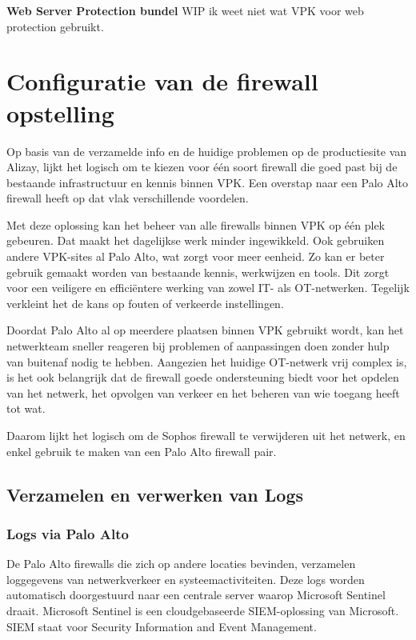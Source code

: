 \textbf{Web Server Protection bundel}
WIP ik weet niet wat VPK voor web protection gebruikt.




\chapter{Configuratie van de firewall opstelling}
\label{ch:configFW}

Op basis van de verzamelde info en de huidige problemen op de productiesite van Alizay, lijkt het logisch om te kiezen voor één soort firewall die goed past bij de bestaande infrastructuur en kennis binnen VPK. Een overstap naar een Palo Alto firewall heeft op dat vlak verschillende voordelen.

\vspace{5mm}
Met deze oplossing kan het beheer van alle firewalls binnen VPK op één plek gebeuren. Dat maakt het dagelijkse werk minder ingewikkeld. Ook gebruiken andere VPK-sites al Palo Alto, wat zorgt voor meer eenheid. Zo kan er beter gebruik gemaakt worden van bestaande kennis, werkwijzen en tools. Dit zorgt voor een veiligere en efficiëntere werking van zowel IT- als OT-netwerken. Tegelijk verkleint het de kans op fouten of verkeerde instellingen.

\vspace{5mm}
Doordat Palo Alto al op meerdere plaatsen binnen VPK gebruikt wordt, kan het netwerkteam sneller reageren bij problemen of aanpassingen doen zonder hulp van buitenaf nodig te hebben. Aangezien het huidige OT-netwerk vrij complex is, is het ook belangrijk dat de firewall goede ondersteuning biedt voor het opdelen van het netwerk, het opvolgen van verkeer en het beheren van wie toegang heeft tot wat.

\vspace{5mm}
Daarom lijkt het logisch om de Sophos firewall te verwijderen uit het netwerk, en enkel gebruik te maken van een Palo Alto firewall pair.

\newpage

\section{Verzamelen en verwerken van Logs}

\subsection{Logs via Palo Alto}
De Palo Alto firewalls die zich op andere locaties bevinden, verzamelen loggegevens van netwerkverkeer en systeemactiviteiten. Deze logs worden automatisch doorgestuurd naar een centrale server waarop Microsoft Sentinel draait. Microsoft Sentinel is een cloudgebaseerde SIEM-oplossing van Microsoft. SIEM staat voor Security Information and Event Management.

